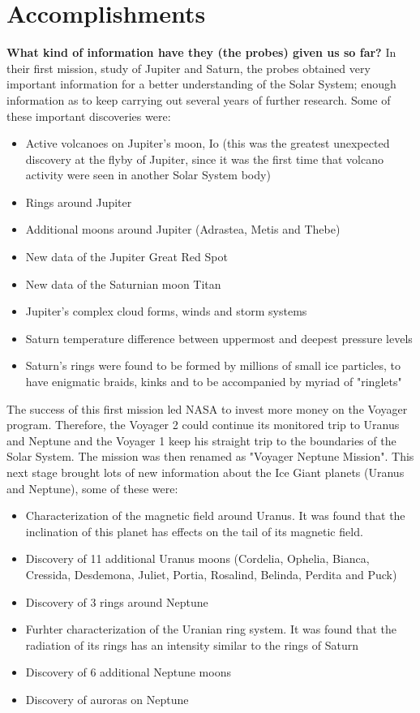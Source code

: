 \documentclass[11pt,a4paper]{article}
\begin{document}
\section{Accomplishments}
\textbf{What kind of information have they (the probes) given us so far?}
In their first mission, study of Jupiter and Saturn, the probes obtained very important information for a better understanding of the Solar System; enough information as to keep carrying out several years of further research. Some of these important discoveries were: 
\begin{itemize}
\item Active volcanoes on Jupiter's moon, Io (this was the greatest unexpected discovery at the flyby of Jupiter, since it was the first time that volcano activity were seen in another Solar System body)
\item Rings around Jupiter
\item Additional moons around Jupiter (Adrastea, Metis and Thebe)
\item New data of the Jupiter Great Red Spot
\item New data of the Saturnian moon Titan
\item Jupiter's complex cloud forms, winds and storm systems
\item Saturn temperature difference between uppermost and deepest pressure levels 
\item Saturn’s rings were found to be formed by millions of small ice particles, to have enigmatic braids, kinks and to be accompanied by myriad of "ringlets"
\end{itemize}
The success of this first mission led NASA to invest more money on the Voyager program. Therefore, the Voyager 2 could continue its monitored trip to Uranus and Neptune and the Voyager 1 keep his straight trip to the boundaries of the Solar System. The mission was then renamed as "Voyager Neptune Mission". This next stage brought lots of new information about the Ice Giant planets (Uranus and Neptune), some of these were:
\begin{itemize}
\item Characterization of the magnetic field around Uranus. It was found that the inclination of this planet has effects on the tail of its magnetic field.
\item Discovery of 11 additional Uranus moons (Cordelia, Ophelia, Bianca, Cressida, Desdemona, Juliet, Portia, Rosalind, Belinda, Perdita and Puck)
\item Discovery of 3 rings around Neptune
\item Furhter characterization of the Uranian ring system. It was found that the radiation of its rings has an intensity similar to the rings of Saturn
\item Discovery of 6 additional Neptune moons
\item Discovery of auroras on Neptune
\end{itemize}
\end{document}
